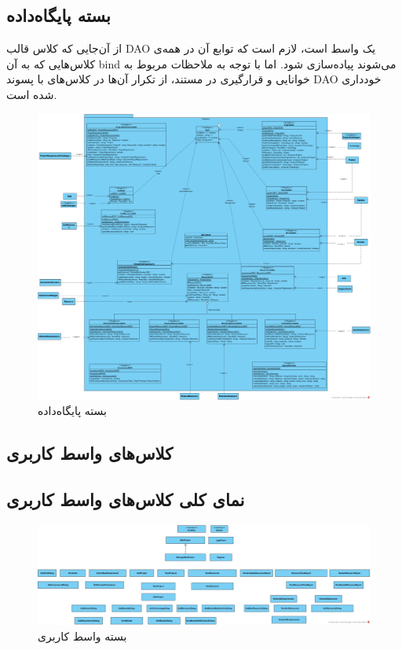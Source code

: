 \begin{landscape}
\section{بسته پایگاه‌داده}
از آن‌جایی که کلاس قالب
 DAO یک واسط است، لازم است که توابع آن در همه‌ی کلاس‌هایی که به آن bind می‌شوند پیاده‌سازی شود. اما با توجه به ملاحظات مربوط به خوانایی و قرارگیری در مستند، از تکرار آن‌ها در کلاس‌های با پسوند DAO خودداری شده است.
\begin{figure}[H]
	\centering
	\includegraphics[scale=0.45]{img/class-design/DatabasePackage}
	\caption{بسته پایگاه‌داده}
\end{figure}
\end{landscape}


\begin{landscape}
\section{کلاس‌های واسط کاربری}
\subsection{نمای کلی کلاس‌های واسط کاربری}
\begin{figure}[H]
	\centering
	\includegraphics[scale=0.6]{img/class-design/ui/UI}
	\caption{بسته واسط کاربری}
\end{figure}
\end{landscape}

